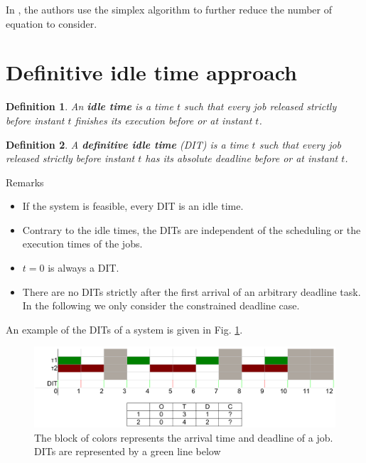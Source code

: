 \documentclass[a4paper,10pt]{article}
\newtheorem{definition}{Definition}
\begin{document}
In \cite{lipariaverage}, the authors use the simplex algorithm to further reduce the number of equation to consider.\\

\section{Definitive idle time approach}
\label{sct:DIT}

\begin{definition}
An \textbf{idle time} is a time $t$ such that every job released strictly before instant $t$ finishes its execution before  or at instant $t$.\\
\end{definition}

\begin{definition}
A \textbf{definitive idle time} (DIT) is a time $t$ such that every job released strictly before instant $t$ has its absolute deadline before or at instant $t$.\\
\end{definition}

Remarks
 \begin{itemize}
  \item If the system is feasible, every DIT is an idle time.
  \item Contrary to the idle times, the DITs are independent of the scheduling or the execution times of the jobs.
  \item $t=0$ is always a DIT.
  \item There are no DITs strictly after the first arrival of an arbitrary deadline task. In the following we only consider the constrained deadline case.
 \end{itemize}

 An example of the DITs of a system is given in Fig. \ref{fig:ditExample}.

 \begin{figure}[h]
\begin{center}
\includegraphics[width=\textwidth]{figs/dit_example.png}
\caption{The block of colors represents the arrival time and deadline of a job. DITs are represented by a green line below}
\label{fig:ditExample}
\end{center}
\end{figure}
\end{document}
